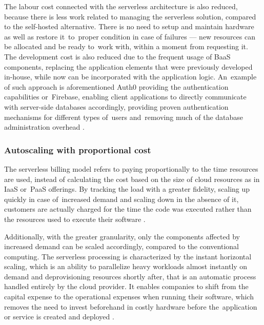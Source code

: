 The labour cost connected with the serverless architecture is also reduced, because there is less work related to managing the serverless solution, compared to the self-hosted alternative. There is no need to setup and maintain hardware as well as restore it~to~proper condition in case of failures --- new resources can be allocated and be ready to~work with, within a moment from requesting it. The development cost is also reduced due to the frequent usage of BaaS components, replacing the application elements that were previously developed in-house, while now can be incorporated with the application logic. An~example of such approach is aforementioned Auth0 providing the authentication capabilities or~Firebase, enabling client applications to directly communicate with server-side databases accordingly, providing proven authentication mechanisms for different types of~users and~removing much of the database administration overhead \cite{MartinFowlerServerless}.

\subsubsection{Autoscaling with proportional cost} \label{chapter:serverless-autoscaling-with-proportional-cost}

The serverless billing model refers to paying proportionally to the time resources are used, instead of calculating the cost based on the size of cloud resources as in IaaS or~PaaS offerings. By tracking the load with a greater fidelity, scaling up quickly in case of~increased demand and scaling down in the absence of it, customers are actually charged for the time the code was executed rather than the resources used to execute their software \cite{BerkeleyServerless}.

Additionally, with the greater granularity, only the components affected by increased demand can be scaled accordingly, compared to the conventional computing. The serverless processing is characterized by the instant horizontal scaling, which is an ability to parallelize heavy workloads almost instantly on demand and deprovisioning resources shortly after, that is an automatic process handled entirely by the cloud provider. It enables companies to shift from the capital expense to the operational expenses when running their software, which removes the need to invest beforehand in costly hardware before the~application or service is created and deployed \cite{LeveragingServerlessCloudComputingArchitectures}.

